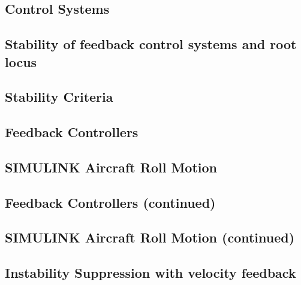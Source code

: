 \documentclass[12pt,letter]{article}
\begin{document}
\subsection{Control Systems}


\subsection{Stability of feedback control systems and root locus}


\subsection{Stability Criteria}


\subsection{Feedback Controllers}


\subsection{SIMULINK Aircraft Roll Motion}


\subsection{Feedback Controllers (continued)}


\subsection{SIMULINK Aircraft Roll Motion (continued)}


\subsection{Instability Suppression with velocity feedback}




	\pagebreak
	\renewcommand{\thepage}{}
	\renewcommand\refname{References Cited}
	\pagestyle{plain}
	
	
\end{document}
